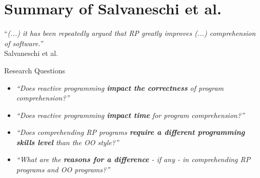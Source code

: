 \documentclass{beamer}
\begin{document}

\section{Summary of Salvaneschi et al.}


\begin{frame}[focus]
	``\emph{(...) it has been repeatedly argued that RP greatly improves (...) comprehension of software.}''
	\\\bigskip
	\small{Salvaneschi et al. \cite{7827078}}
\end{frame}


\begin{frame}{Research Questions \cite{7827078}}
	\begin{itemize}
		\item \emph{``Does reactive programming \textbf{impact the correctness} of program comprehension?''}\bigskip
		\item \emph{``Does reactive programming \textbf{impact time} for program comprehension?''}\bigskip
		\item \emph{``Does comprehending RP programs \textbf{require a different programming skills level} than the OO style?''}\bigskip
		\item \emph{``What are the \textbf{reasons for a difference} - if any - in comprehending RP programs and OO programs?''}
	\end{itemize}
\end{frame}
\end{document}
